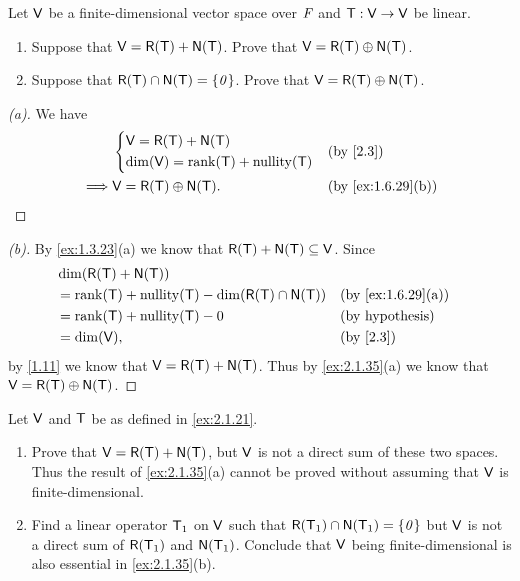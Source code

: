 \begin{ex}\label{ex:2.1.35}
  Let \(\mathsf{V}\) be a finite-dimensional vector space over \(\mathit{F}\) and \(\mathsf{T} : \mathsf{V} \to \mathsf{V}\) be linear.
  \begin{enumerate}
    \item Suppose that \(\V = \rg{\T} + \ns{\T}\).
          Prove that \(\V = \rg{\T} \oplus \ns{\T}\).
    \item Suppose that \(\rg{\T} \cap \ns{\T} = \set{\zv}\).
          Prove that \(\V = \rg{\T} \oplus \ns{\T}\).
  \end{enumerate}
\end{ex}

\begin{proof}[(a)]
  We have
  \begin{align*}
             & \begin{dcases}
                 \V = \rg{\T} + \ns{\T} \\
                 \dim(\V) = \rk{\T} + \nt{\T}
               \end{dcases} &  & \by{2.3}                         \\
    \implies & \V = \rg{\T} \oplus \ns{\T}. &  & \by{ex:1.6.29}[b]
  \end{align*}
\end{proof}

\begin{proof}[(b)]
  By \cref{ex:1.3.23}(a) we know that \(\rg{\T} + \ns{\T} \subseteq \V\).
  Since
  \begin{align*}
     & \dim(\rg{\T} + \ns{\T})                                                      \\
     & = \rk{\T} + \nt{\T} - \dim(\rg{\T} \cap \ns{\T}) &  & \by{ex:1.6.29}[a]      \\
     & = \rk{\T} + \nt{\T} - 0                          &  & \text{(by hypothesis)} \\
     & = \dim(\V),                                      &  & \by{2.3}
  \end{align*}
  by \cref{1.11} we know that \(\V = \rg{\T} + \ns{\T}\).
  Thus by \cref{ex:2.1.35}(a) we know that \(\V = \rg{\T} \oplus \ns{\T}\).
\end{proof}

\begin{ex}\label{ex:2.1.36}
  Let \(\mathsf{V}\) and \(\mathsf{T}\) be as defined in \cref{ex:2.1.21}.
  \begin{enumerate}
    \item Prove that \(\V = \rg{\T} + \ns{\T}\), but \(\mathsf{V}\) is not a direct sum of these two spaces.
          Thus the result of \cref{ex:2.1.35}(a) cannot be proved without assuming that \(\mathsf{V}\) is finite-dimensional.
    \item Find a linear operator \(\mathsf{T}_1\) on \(\mathsf{V}\) such that \(\rg{\T_1} \cap \ns{\T_1} = \set{\zv}\) but \(\mathsf{V}\) is not a direct sum of \(\rg{\T_1}\) and \(\ns{\T_1}\).
          Conclude that \(\mathsf{V}\) being finite-dimensional is also essential in \cref{ex:2.1.35}(b).
  \end{enumerate}
\end{ex}

